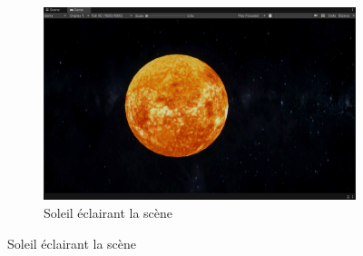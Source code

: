 \documentclass[a4paper,10pt]{article}
\begin{document}
\begin{figure}[h]
	\begin{subfigure}{\textwidth}
		\begin{center}
			\includegraphics[width=.8\textwidth]{fig/config-soleil}
			\caption{Soleil éclairant la scène}
			\label{fig:config-soleil}
		\end{center}
	\end{subfigure}
\end{figure}
\fi 
\end{document}
